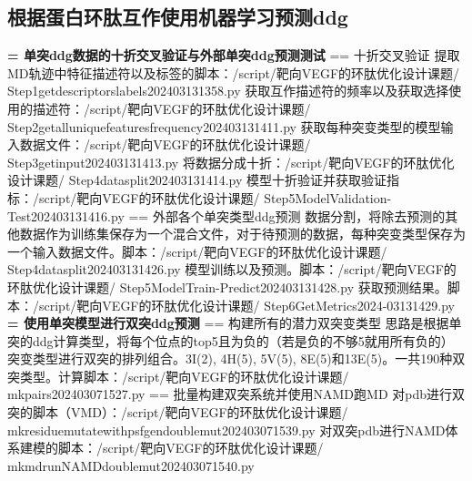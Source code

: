 \subsection{根据蛋白环肽互作使用机器学习预测ddg}
\noindent\textbf{= 单突ddg数据的十折交叉验证与外部单突ddg预测测试}
\newline == 十折交叉验证
\newline\indent 提取MD轨迹中特征描述符以及标签的脚本：/script/靶向VEGF的环肽优化设计课题/ Step1getdescriptorslabels202403131358.py
\newline\indent 获取互作描述符的频率以及获取选择使用的描述符：/script/靶向VEGF的环肽优化设计课题/ Step2getalluniquefeaturesfrequency202403131411.py
\newline\indent 获取每种突变类型的模型输入数据文件：/script/靶向VEGF的环肽优化设计课题/ Step3getinput202403131413.py
\newline\indent 将数据分成十折：/script/靶向VEGF的环肽优化设计课题/ Step4datasplit202403131414.py
\newline\indent 模型十折验证并获取验证指标：/script/靶向VEGF的环肽优化设计课题/ Step5ModelValidation-Test202403131416.py
\newline == 外部各个单突类型ddg预测
\newline\indent 数据分割，将除去预测的其他数据作为训练集保存为一个混合文件，对于待预测的数据，每种突变类型保存为一个输入数据文件。脚本：/script/靶向VEGF的环肽优化设计课题/ Step4datasplit202403131426.py
\newline\indent 模型训练以及预测。脚本：/script/靶向VEGF的环肽优化设计课题/ Step5ModelTrain-Predict202403131428.py
\newline\indent 获取预测结果。脚本：/script/靶向VEGF的环肽优化设计课题/ Step6GetMetrics2024-03131429.py
\newline\noindent\textbf{= 使用单突模型进行双突ddg预测}
\newline == 构建所有的潜力双突变类型
\newline\indent 思路是根据单突的ddg计算类型，将每个位点的top5且为负的（若是负的不够5就用所有负的）突变类型进行双突的排列组合。3I(2), 4H(5), 5V(5), 8E(5)和13E(5)。一共190种双突类型。计算脚本：/script/靶向VEGF的环肽优化设计课题/ mkpairs202403071527.py
\newline == 批量构建双突系统并使用NAMD跑MD
\newline\indent 对pdb进行双突的脚本（VMD）：/script/靶向VEGF的环肽优化设计课题/ mkresiduemutatewithpsfgendoublemut202403071539.py 
\newline\indent 对双突pdb进行NAMD体系建模的脚本：/script/靶向VEGF的环肽优化设计课题/ mkmdrunNAMDdoublemut202403071540.py
